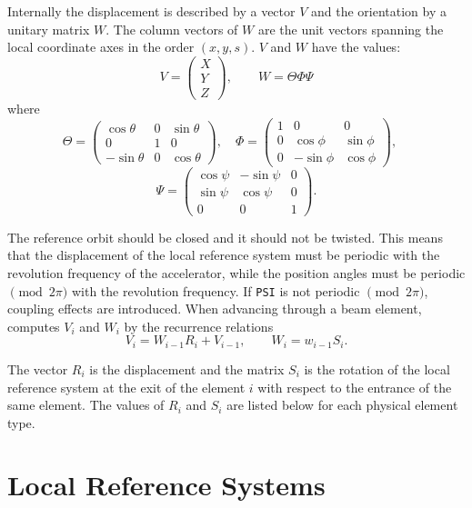 Internally the displacement is described by a vector $V$
and the orientation by a unitary matrix $W$.
The column vectors of $W$ are the unit vectors spanning
the local coordinate axes in the order $(x, y, s)$.
$V$ and $W$ have the values:
\[
V=\left(\begin{array}{c}
    X \\
    Y \\
    Z
  \end{array}\right),
\qquad
W=\Theta\Phi\Psi
\]
where
\[
\Theta=\left(\begin{array}{ccc}
    \cos\theta &  0 &  \sin\theta \\
    0         &  1 &   0 \\
    -\sin\theta &  0 &  \cos\theta
  \end{array}\right),
\quad
\Phi=\left(\begin{array}{ccc}
    1 &  0        &  0 \\
    0 &  \cos\phi &  \sin\phi \\
    0 & -\sin\phi &  \cos\phi
  \end{array}\right),
\quad
\]
\[
\Psi=\left(\begin{array}{ccc}
    \cos\psi & -\sin\psi &  0 \\
    \sin\psi &  \cos\psi &  0 \\
    0        &  0        &  1
  \end{array}\right).
\]

The reference orbit should be closed and it should not be twisted.
This means that the displacement of the local reference system
must be periodic with the revolution frequency of the accelerator,
while the position angles must be periodic $\pmod{2\pi}$
with the revolution frequency.
If \texttt{PSI} is not periodic $\pmod{2\pi}$,
coupling effects are introduced.
When advancing through a beam element,
\opalmap computes $V_i$ and $W_i$
by the recurrence relations
\[
V_i = W_{i-1}R_i + V_{i-1}, \qquad
W_i = w_{i-1}S_i.
\]

The vector $R_i$ is the displacement and the matrix
$S_i$ is the rotation of the local reference system
at the exit of the element $i$ with respect to the entrance
of the same element.
The values of $R_i$ and $S_i$
are listed below for each physical element type.

\section{Local Reference Systems}
